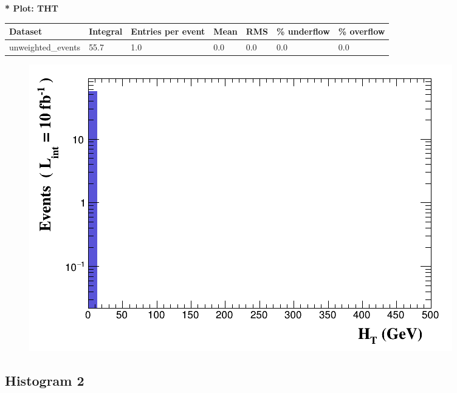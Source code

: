 \documentclass[a4paper, 10pt]{article}
\begin{document}
\textbf{* Plot: THT}\\
   \begin{table}[H]
  \begin{center}
    \begin{tabular}{|m{23.0mm}|m{23.0mm}|m{18.0mm}|m{19.0mm}|m{19.0mm}|m{19.0mm}|m{19.0mm}|}
      \hline
      {\cellcolor{yellow}         Dataset}& {\cellcolor{yellow}         Integral}& {\cellcolor{yellow}         Entries per event}& {\cellcolor{yellow}         Mean}& {\cellcolor{yellow}         RMS}& {\cellcolor{yellow}         \% underflow}& {\cellcolor{yellow}         \% overflow}\\
      \hline
      {\cellcolor{white}         unweighted\_events}& {\cellcolor{white}         55.7}& {\cellcolor{white}         1.0}& {\cellcolor{white}         0.0}& {\cellcolor{white}         0.0}& {\cellcolor{green}         0.0}& {\cellcolor{green}         0.0}\\
\hline
    \end{tabular}
  \end{center}
\end{table}

\begin{figure}[H]
  \begin{center}
    \includegraphics[scale=0.45]{selection_0.png}\\
\caption{   }
  \end{center}
\end{figure}
      \newpage
\subsection{ Histogram 2}
\end{document}
